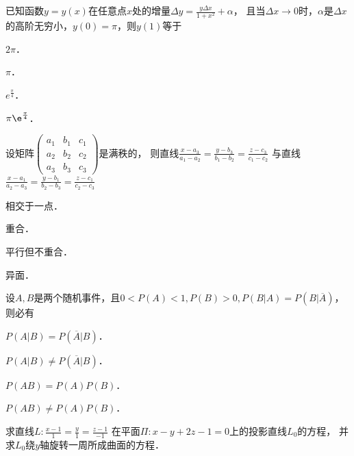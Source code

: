 \documentclass[plain,noanswer,medmath]{../../template/jnuexam}
\begin{document}
\begin{problem}
已知函数$y = y(x)$在任意点$x$处的增量$\Delta y = \frac{y\Delta x}{1 + x^2} + \alpha$，
且当$\Delta x \to 0$时，$\alpha$是$\Delta x$的高阶无穷小，$y(0) = \pi$，则$y(1)$等于\pickout{}
\begin{abcd}
\item $2\pi$．
\item $\pi$．
\item $e^{\frac{\pi}{4}}$．
\item $\pi \e^{\frac{\pi}{4}}$．
\end{abcd}
\end{problem}


\begin{problem}
设矩阵$\begin{pmatrix}
  a_1 & b_1 & c_1 \\
  a_2 & b_2 & c_2 \\
  a_3 & b_3 & c_3
\end{pmatrix}$是满秩的，
则直线$\frac{x - a_3}{a_1 - a_2} = \frac{y - b_3}{b_1 - b_2} = \frac{z - c_3}{c_1 - c_2}$
与直线$\frac{x - a_1}{a_2 - a_3} = \frac{y - b_1}{b_2 - b_3} = \frac{z - c_1}{c_2 - c_3}$\pickout{}
\begin{abcd*}
\item 相交于一点．
\item 重合．
\item 平行但不重合．
\item 异面．
\end{abcd*}
\end{problem}


\begin{problem}
设$A,B$是两个随机事件，且$0 < P(A) < 1,P(B) > 0,P(B|A) = P(B|\overline{A})$，则必有\pickout{}
\begin{abcd}
\item $P(A|B) = P(\overline{A} |B)$．
\item $P(A|B) \ne P(\overline{A} |B)$．
\item $P(AB) = P(A)P(B)$．
\item $P(AB) \ne P(A)P(B)$．
\end{abcd}
\end{problem}



\begin{problem}
求直线$L:\frac{x - 1}{1} = \frac{y}{1} = \frac{z - 1}{-1}$
在平面$\Pi :x - y + 2z - 1 = 0$上的投影直线$L_0$的方程，
并求$L_0$绕$y$轴旋转一周所成曲面的方程．
\end{problem}
\end{document}
